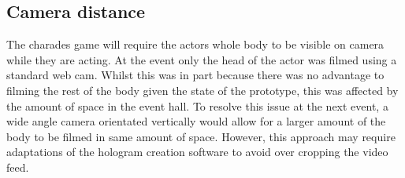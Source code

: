 \subsection{Camera distance}
The charades game will require the actors whole body to be visible on camera while they are acting. At the event only the head of the actor was filmed using a standard web cam. Whilst this was in part because there was no advantage to filming the rest of the body given the state of the prototype, this was affected by the amount of space in the event hall. To resolve this issue at the next event, a wide angle camera orientated vertically would allow for a larger amount of the body to be filmed in same amount of space. However, this approach may require adaptations of the hologram creation software to avoid over cropping the video feed.
